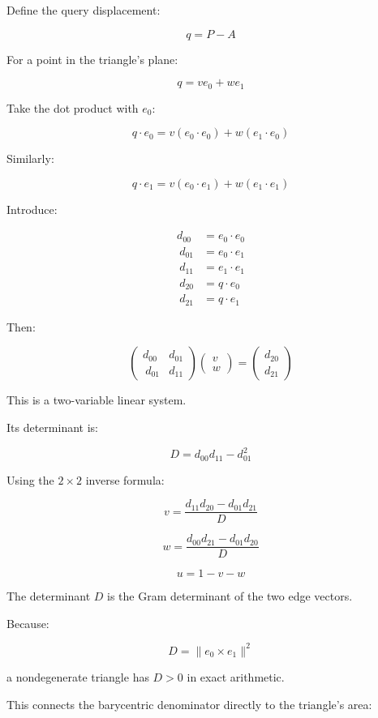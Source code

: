 Define the query displacement:

\[
q=P-A
\]

For a point in the triangle's plane:

\[
q=ve_0+we_1
\]

Take the dot product with \(e_0\):

\[
q\cdot e_0 = v(e_0\cdot e_0)+w(e_1\cdot e_0)
\]

Similarly:

\[
q\cdot e_1 = v(e_0\cdot e_1)+w(e_1\cdot e_1)
\]

Introduce:

\[
\begin{aligned} d_{00}&=e_0\cdot e_0\\\ d_{01}&=e_0\cdot e_1\\\ d_{11}&=e_1\cdot e_1\\\ d_{20}&=q\cdot e_0\\\ d_{21}&=q\cdot e_1 \end{aligned}
\]

Then:

\[
\begin{pmatrix} d_{00}&d_{01}\\\ d_{01}&d_{11} \end{pmatrix} \begin{pmatrix}v\\w\end{pmatrix} = \begin{pmatrix}d_{20}\\d_{21}\end{pmatrix}
\]

This is a two-variable linear system.

Its determinant is:

\[
D=d_{00}d_{11}-d_{01}^2
\]

Using the \(2\times2\) inverse formula:

\[
\boxed{ v=\frac{d_{11}d_{20}-d_{01}d_{21}}{D} }
\]

\[
\boxed{ w=\frac{d_{00}d_{21}-d_{01}d_{20}}{D} }
\]

\[
\boxed{u=1-v-w}
\]

The determinant \(D\) is the Gram determinant of the two edge vectors.

Because:

\[
D=\|e_0\times e_1\|^2
\]

a nondegenerate triangle has \(D>0\) in exact arithmetic.

This connects the barycentric denominator directly to the triangle's area:

